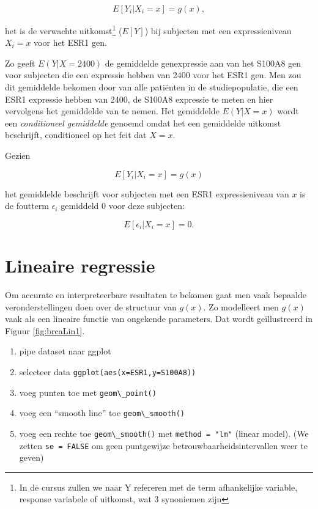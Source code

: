 \documentclass[
  12pt,dutch,coursenotes]{book}
\newcommand{\passthrough}[1]{#1}
\providecommand{\tightlist}{%
  \setlength{\itemsep}{0pt}\setlength{\parskip}{0pt}}
\begin{document}
\[E[Y_i|X_i=x]=g(x),\]

het is de verwachte uitkomst\footnote{In de cursus zullen we naar Y refereren met de term afhankelijke variable, response variabele of uitkomst, wat 3 synoniemen zijn} (\(E[Y]\)) bij subjecten met een expressieniveau \(X_i=x\) voor het ESR1 gen.

Zo geeft \(E(Y|X=2400)\) de gemiddelde genexpressie aan van het S100A8 gen voor subjecten die een expressie hebben van 2400 voor het ESR1 gen.
Men zou dit gemiddelde bekomen door van alle patiënten in de studiepopulatie, die een ESR1 expressie hebben van 2400, de S100A8 expressie te meten en hier vervolgens het gemiddelde van te nemen.
Het gemiddelde \(E(Y|X=x)\) wordt
een \emph{conditioneel gemiddelde} genoemd omdat het een gemiddelde
uitkomst beschrijft, conditioneel op het feit dat \(X=x\).

Gezien

\[E[Y_i|X_i=x]=g(x)\]

het gemiddelde beschrijft voor subjecten met een ESR1 expressieniveau van \(x\) is de foutterm \(\epsilon_i\) gemiddeld 0 voor deze subjecten:

\[E[\epsilon_i\vert X_i=x]=0.\]

\hypertarget{lineaire-regressie}{%
\section{Lineaire regressie}\label{lineaire-regressie}}

Om accurate en interpreteerbare resultaten te bekomen gaat men vaak bepaalde veronderstellingen doen over de structuur van \(g(x)\).
Zo modelleert men \(g(x)\) vaak als een lineaire functie van ongekende parameters.
Dat wordt geïllustreerd in Figuur \ref{fig:brcaLin1}.

\begin{enumerate}
\def\labelenumi{\arabic{enumi}.}
\tightlist
\item
  pipe dataset naar ggplot
\item
  selecteer data \passthrough{\lstinline!ggplot(aes(x=ESR1,y=S100A8))!}
\item
  voeg punten toe met \passthrough{\lstinline!geom\_point()!}
\item
  voeg een ``smooth line'' toe \passthrough{\lstinline!geom\_smooth()!}
\item
  voeg een rechte toe \passthrough{\lstinline!geom\_smooth()!} met \passthrough{\lstinline!method = "lm"!} (linear model). (We zetten \passthrough{\lstinline!se = FALSE!} om geen puntgewijze betrouwbaarheidsintervallen weer te geven)
\end{enumerate}
\end{document}
